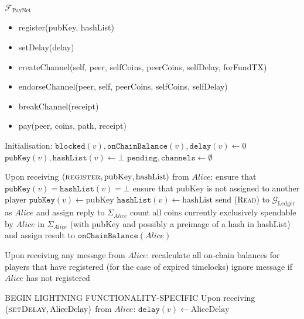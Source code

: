 \begin{functionality}{$\mathcal{F}_{\mathrm{PayNet}}$}
  \label{alg:payfunc}
    \begin{itemize}
      \item register(pubKey, hashList)
      \item setDelay(delay)
      \item createChannel(self, peer, selfCoins, peerCoins, selfDelay, forFundTX)
      \item endorseChannel(peer, self, peerCoins, selfCoins, selfDelay)
      \item breakChannel(receipt)
      \item pay(peer, coins, path, receipt)
    \end{itemize}

  \begin{algorithmic}[1]
    \State Initialisation:
      \Indent
        \State $\mathtt{blocked}\left(v\right),
        \mathtt{onChainBalance}\left(v\right), \mathtt{delay}\left(v\right)
        \gets 0$
        \State $\mathtt{pubKey}\left(v\right), \mathtt{hashList}\left(v\right)
        \gets \bot$
      \EndFor
      \State $\mathtt{pending}, \mathtt{channels} \gets \emptyset$
      \EndIndent
    \State

    \State Upon receiving $\left(\textsc{register}, \mathrm{pubKey},
    \mathrm{hashList}\right)$ from $Alice$:
    \Indent
      \State ensure that $\mathtt{pubKey}\left(v\right) =
      \mathtt{hashList}\left(v\right) = \bot$
      \State ensure that pubKey is not assigned to another player
      \State $\mathtt{pubKey}\left(v\right) \gets \mathrm{pubKey}$
      \State $\mathtt{hashList}\left(v\right) \gets \mathrm{hashList}$
      \State send (\textsc{Read}) to $\mathcal{G}_{\mathrm{Ledger}}$ as $Alice$
      and assign reply to $\Sigma_{Alice}$
      \State count all coins currently exclusively spendable by $Alice$ in
      $\Sigma_{Alice}$ (with pubKey and possibly a preimage of a hash in
      hashList) and assign result to $\mathtt{onChainBalance}\left(Alice\right)$
    \EndIndent
    \State

    \State Upon receiving any message from $Alice$:
    \Indent
      \State recalculate all on-chain balances for players that have registered
      (for the case of expired timelocks)
      \State ignore message if $Alice$ has not registered
    \EndIndent
    \State

    \State BEGIN LIGHTNING FUNCTIONALITY-SPECIFIC
    \State Upon receiving $\left(\textsc{setDelay}, \mathrm{AliceDelay}\right)$
    from $Alice$:
    \Indent
      \State $\mathtt{delay}\left(v\right) \gets \mathrm{AliceDelay}$
    \EndIndent
    \State


\end{algorithmic}
\end{functionality}

